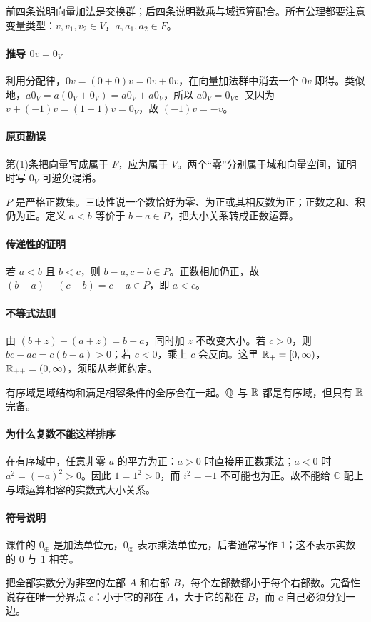 前四条说明向量加法是交换群；后四条说明数乘与域运算配合。所有公理都要注意变量类型：$v,v_1,v_2\in V$，$a,a_1,a_2\in F$。
\paragraph{推导 $0v=0_V$}利用分配律，$0v=(0+0)v=0v+0v$，在向量加法群中消去一个 $0v$ 即得。类似地，$a0_V=a(0_V+0_V)=a0_V+a0_V$，所以 $a0_V=0_V$。又因为 $v+(-1)v=(1-1)v=0_V$，故 $(-1)v=-v$。
\paragraph{原页勘误}第(1)条把向量写成属于 $F$，应为属于 $V$。两个“零”分别属于域和向量空间，证明时写 $0_V$ 可避免混淆。

$P$ 是严格正数集。三歧性说一个数恰好为零、为正或其相反数为正；正数之和、积仍为正。定义 $a<b$ 等价于 $b-a\in P$，把大小关系转成正数运算。
\paragraph{传递性的证明}若 $a<b$ 且 $b<c$，则 $b-a,c-b\in P$。正数相加仍正，故 $(b-a)+(c-b)=c-a\in P$，即 $a<c$。
\paragraph{不等式法则}由 $(b+z)-(a+z)=b-a$，同时加 $z$ 不改变大小。若 $c>0$，则 $bc-ac=c(b-a)>0$；若 $c<0$，乘上 $c$ 会反向。这里 $\mathbb{R}_+=[0,\infty)$，$\mathbb{R}_{++}=(0,\infty)$，须服从老师约定。

有序域是域结构和满足相容条件的全序合在一起。$\mathbb{Q}$ 与 $\mathbb{R}$ 都是有序域，但只有 $\mathbb{R}$ 完备。
\paragraph{为什么复数不能这样排序}在有序域中，任意非零 $a$ 的平方为正：$a>0$ 时直接用正数乘法；$a<0$ 时 $a^2=(-a)^2>0$。因此 $1=1^2>0$，而 $i^2=-1$ 不可能也为正。故不能给 $\mathbb C$ 配上与域运算相容的实数式大小关系。
\paragraph{符号说明}课件的 $0_\oplus$ 是加法单位元，$0_\otimes$ 表示乘法单位元，后者通常写作 $1$；这不表示实数的 $0$ 与 $1$ 相等。

把全部实数分为非空的左部 $A$ 和右部 $B$，每个左部数都小于每个右部数。完备性说存在唯一分界点 $c$：小于它的都在 $A$，大于它的都在 $B$，而 $c$ 自己必须分到一边。
